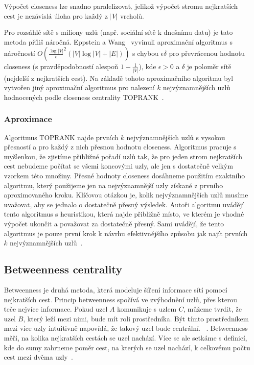 \documentclass{bakalarka}
\begin{document}
Výpočet closeness lze snadno paralelizovat, jelikož výpočet stromu nejkratších
cest je nezávislá úloha pro každý z $|V|$ vrcholů.

Pro rozsáhlé sítě s miliony uzlů (např. sociální sítě k dnešnímu datu) je tato
metoda příliš náročná. Eppstein a Wang~\citep{closenessapproximation} vyvinuli
aproximační algoritmus s náročností $O(\frac{\log|V|}{\epsilon}^2 (|V| \log |V|
+ |E|))$ s chybou $\epsilon \delta$ pro převrácenou hodnotu closeness (s
pravděpodobností alespoň $1 - \frac{1}{|V|}$), kde $\epsilon > 0$ a $\delta$ je
poloměr sítě (nejdelší z nejkratších cest). Na základě tohoto aproximačního
algoritmu byl vytvořen jiný aproximační algoritmus pro nalezení $k$
nejvýznamnějších uzlů hodnocených podle closeness centrality
TOPRANK~\citep{closenessapproximation}.

\subsubsection{Aproximace}
Algoritmus TOPRANK najde prvních $k$ nejvýznamnějších uzlů s vysokou přesností
a pro každý z nich přesnou hodnotu closeness. Algoritmus pracuje s myšlenkou,
že zjistíme přibližné pořadí uzlů tak, že pro jeden strom nejkratších cest
nebudeme počítat se všemi koncovými uzly, ale jen s dostatečně velkým vzorkem
této množiny. Přesné hodnoty closeness dosáhneme použitím exaktního algoritmu,
který použijeme jen na nejvýznamnější uzly získané z prvního aproximovaného
kroku. Klíčovou otázkou je, kolik nejvýznamnějších uzlů musíme uvažovat, aby se
jednalo o dostatečně přesný výsledek. Autoři algoritmu uvádějí tento algoritmus
s heuristikou, která najde přibližně místo, ve kterém je vhodné výpočet ukončit
a považovat za dostatečně přesný. Sami uvádějí, že tento algoritmus je pouze
první krok k návrhu efektivnějšího způsobu jak najít prvních $k$
nejvýznamnějších uzlů~\citep{closenessapproximation}.

\subsection{Betweenness centrality}
Betweenness je druhá metoda, která modeluje šíření informace sítí pomocí
nejkratších cest. Princip betweenness spočívá ve zvýhodnění uzlů, přes kterou
teče nejvíce informace. Pokud uzel $A$ komunikuje s uzlem $C$, můžeme tvrdit,
že uzel $B$, který leží mezi nimi, bude mít roli prostředníka. Být tímto
prostředníkem mezi více uzly intuitivně napovídá, že takový uzel bude
centrální. ~\citep{hannemanriddle2005}. Betweenness měří, na kolika
nejkratších cestách se uzel nachází. Více se ale setkáme s definicí, kde do
sumy zahrneme poměr cest, na kterých se uzel nachází, k celkovému počtu cest
mezi dvěma uzly~\citep{freeman1977,anthonisse1971,brandes2001}.
\end{document}
